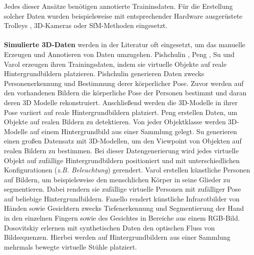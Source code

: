 Jedes dieser Ansätze benötigen annotierte Traininsdaten. Für die Erstellung solcher Daten wurden beispielsweise mit entsprechender Hardware ausgerüstete Trolleys \cite{huitlTUMindoorExtensiveImage2012}, 3D-Kameras \cite{izadiKinectFusionRealtime3D2011} oder SfM-Methoden \cite{kendallPoseNetConvolutionalNetwork2015} eingesetzt.
\\\\
\textbf{Simulierte 3D-Daten} werden in der Literatur oft eingesetzt, um das manuelle Erzeugen und Annotieren von Daten umzugehen. Pishchulin \etal\cite{pishchulinArticulatedPeopleDetection2012a}, Peng \etal\cite{pengLearningDeepObject2014}, Su \etal\cite{suRenderCNNViewpoint2015} und Varol \etal\cite{varolLearningSyntheticHumans2017} erzeugen ihren Trainingsdaten, indem sie virtuelle Objekte auf reale Hintergrundbildern platzieren. Pishchulin \etal\cite{pishchulinArticulatedPeopleDetection2012a} generieren Daten zwecks Personenerkennung und Bestimmung derer körperlicher Pose. Zuvor werden auf den vorhandenen Bildern die körperliche Pose der Personen bestimmt und daran deren 3D Modelle rekonstruiert. Anschließend werden die 3D-Modelle in ihrer Pose variiert auf reale Hintergrundbildern platziert. Peng \etal\cite{pengLearningDeepObject2014} erstellen Daten, um Objekte auf realen Bildern zu detektieren. Von jeder Objektklasse werden 3D-Modelle auf einem Hintergrundbild aus einer Sammlung gelegt. Su \etal\cite{suRenderCNNViewpoint2015} generieren einen großen Datensatz mit 3D-Modellen, um den Viewpoint von Objekten auf realen Bildern zu bestimmen. Bei dieser Datengenerierung wird jedes virtuelle Objekt auf zufällige Hintergrundbildern positioniert und mit unterschiedlichen Konfigurationen (\textit{z.B. Beleuchtung}) gerendert. 
Varol \etal\cite{varolLearningSyntheticHumans2017} erstellen künstliche Personen auf Bildern, um beispielsweise den menschlichen Körper in seine Glieder zu segmentieren. Dabei rendern sie zufällige virtuelle Personen mit zufälliger Pose auf beliebige Hintergrundbildern.
Fanello \etal\cite{fanelloLearningBeDepth2014} rendert künstliche Infrarotbilder von Händen sowie Gesichtern zwecks Tiefenerkennung und Segmentierung der Hand in den einzelnen Fingern sowie des Gesichtes in Bereiche aus einem RGB-Bild.
Dosovitskiy \etal\cite{dosovitskiyFlowNetLearningOptical2015} erlernen mit synthetischen Daten den optischen Fluss von Bildsequenzen.  Hierbei werden auf Hintergrundbildern aus einer Sammlung mehrmals bewegte virtuelle Stühle platziert.

